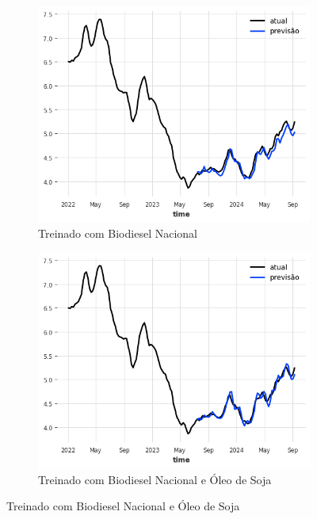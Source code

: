 \begin{figure}[htbp]
	\centering
	\begin{subfigure}[b]{0.45\textwidth}
		\centering
		\includegraphics[width=\textwidth]{figuras/nlinear_takens_brasil_plot.png} %
		\caption{Treinado com Biodiesel Nacional \newline}
		\label{fig:nlinear_takens_brasil_plot}
	\end{subfigure}
	\hfill
	\begin{subfigure}[b]{0.45\textwidth}
		\centering
		\includegraphics[width=\textwidth]{figuras/nlinear_takens_brasil_oil_plot.png} %
		\caption{Treinado com Biodiesel Nacional e Óleo de Soja}
		\label{fig:nlinear_takens_brasil_oil_plot}
	\end{subfigure}


\end{figure}
